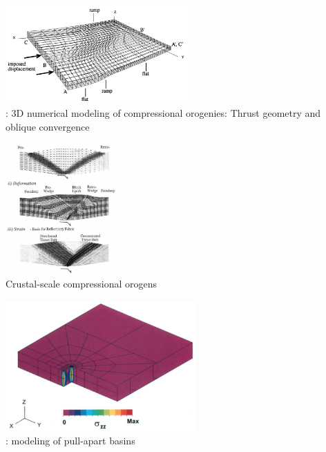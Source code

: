 \begin{center}
\begin{minipage}{0.45\textwidth}
\centering
\includegraphics[width=7cm]{images/history/brau93}\\
{: 3D numerical modeling of
compressional orogenies: Thrust geometry and
oblique convergence \cite{brau93}}
\end{minipage}\hfill
\begin{minipage}{0.45\textwidth}
\centering
\includegraphics[height=5cm]{images/history/bequ94}\\
{\captionfont Crustal-scale compressional orogens \cite{bequ94}}
\end{minipage}
\end{center}

\begin{center}
\includegraphics[height=5cm]{images/history/katl95}\\
{: modeling of pull-apart basins \cite{katl95}}
\end{center}


